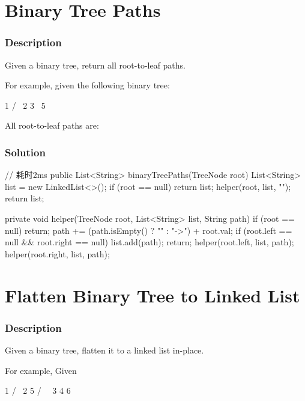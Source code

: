 \newpage

\section{Binary Tree Paths} %

\subsubsection{Description}
Given a binary tree, return all root-to-leaf paths.

For example, given the following binary tree:
\begin{Code}
   1
 /   \
2     3
 \
  5
\end{Code}

All root-to-leaf paths are:

\code{["1->2->5", "1->3"]}

\subsubsection{Solution}

\begin{Code}
// 耗时2ms
public List<String> binaryTreePaths(TreeNode root) {
    List<String> list = new LinkedList<>();
    if (root == null) {
        return list;
    }
    helper(root, list, "");
    return list;
}

private void helper(TreeNode root, List<String> list, String path) {
    if (root == null) {
        return;
    }
    path += (path.isEmpty() ? "" : "->") + root.val;
    if (root.left == null && root.right == null) {
        list.add(path);
        return;
    }
    helper(root.left, list, path);
    helper(root.right, list, path);
}
\end{Code}

\newpage

\section{Flatten Binary Tree to Linked List} %

\subsubsection{Description}
Given a binary tree, flatten it to a linked list in-place.

For example, Given
\begin{Code}
         1
        / \
       2   5
      / \   \
     3   4   6
\end{Code}

